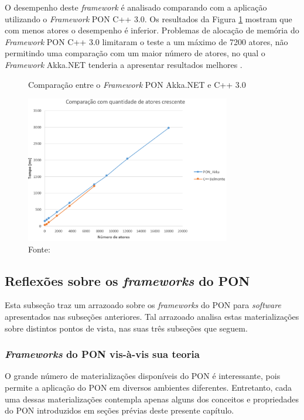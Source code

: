 O desempenho deste \textit{framework} é analisado comparando com a aplicação
utilizando o \textit{Framework} PON C++ 3.0. Os resultados da Figura
\ref{fig:result_akka} mostram que com menos atores o desempenho é inferior.
Problemas de alocação de memória do \textit{Framework} PON C++ 3.0 limitaram o
teste a um máximo de 7200 atores, não permitindo uma comparação com um maior
número de atores, no qual o \textit{Framework} Akka.NET tenderia a apresentar
resultados melhores \cite{martini_2019}.

\begin{figure}[!htb]
  \centering
  \caption{Comparação entre o \textit{Framework} PON Akka.NET e C++ 3.0}
  \includegraphics[width=0.8\textwidth]{../figures/result_akka.png}
  \smallskip
  \caption*{Fonte: }
  \label{fig:result_akka}
\end{figure}

\FloatBarrier

\subsection{Reflexões sobre os \textit{frameworks} do PON}\label{sec:reflex}

Esta subseção traz um arrazoado sobre os \textit{frameworks} do PON para
\textit{software} apresentados nas subseções anteriores. Tal arrazoado analisa
estas materializações sobre distintos pontos de vista, nas suas três subseções
que seguem.

\subsubsection{\textit{Frameworks} do PON vis-à-vis sua teoria}

O grande número de materializações disponíveis do PON é interessante, pois
permite a aplicação do PON em diversos ambientes diferentes. Entretanto, cada
uma dessas materializações contempla apenas alguns dos conceitos e propriedades
do PON introduzidos em seções prévias deste presente capítulo.

